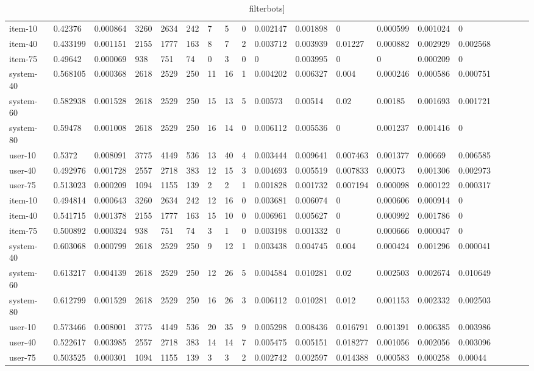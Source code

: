 \begin{table}
{\begin{tabular}{*{19}l}
item-10		&	0.42376  &	0.000864 &	3260 &	2634 &	242 &	7  &	5 &	0 &	0.002147 &	0.001898 &	0 &	0.000599 &	0.001024 &	0 &	 \\
item-40		&	0.433199 &	0.001151 &	2155 &	1777 &	163 &	8  &	7 &	2 &	0.003712 &	0.003939 &	0.01227 &	0.000882 &	0.002929 &	0.002568 &	 \\
item-75		&	0.49642  &	0.000069 &	938  &	751  &	74 &	0  &	3 &	0 &	0 &	0.003995 &	0 &	0 &	0.000209 &	0 &	 \\
system-40	&	0.568105 &	0.000368 &	2618 &	2529 &	250 &	11 &	16 &	1 &	0.004202 &	0.006327 &	0.004 &	0.000246 &	0.000586 &	0.000751 &	 \\
system-60	&	0.582938 &	0.001528 &	2618 &	2529 &	250 &	15 &	13 &	5 &	0.00573 &	0.00514 &	0.02 &	0.00185 &	0.001693 &	0.001721 &	 \\
system-80	&	0.59478  &	0.001008 &	2618 &	2529 &	250 &	16 &	14 &	0 &	0.006112 &	0.005536 &	0 &	0.001237 &	0.001416 &	0 &	 \\
user-10		&	0.5372   &	0.008091 &	3775 &	4149 &	536 &	13 &	40 &	4 &	0.003444 &	0.009641 &	0.007463 &	0.001377 &	0.00669 &	0.006585 &	 \\
user-40		&	0.492976 &	0.001728 &	2557 &	2718 &	383 &	12 &	15 &	3 &	0.004693 &	0.005519 &	0.007833 &	0.00073 &	0.001306 &	0.002973 &	 \\
user-75		&	0.513023 &	0.000209 &	1094 &	1155 &	139 &	2  &	2 &	1 &	0.001828 &	0.001732 &	0.007194 &	0.000098 &	0.000122 &	0.000317 &	 \\

item-10		&	0.494814 &	0.000643 &	3260 &	2634 &	242 &	12 &	16 &	0 &	0.003681 &	0.006074 &	0 &	0.000606 &	0.000914 &	0 &	 \\
item-40		&	0.541715 &	0.001378 &	2155 &	1777 &	163 &	15 &	10 &	0 &	0.006961 &	0.005627 &	0 &	0.000992 &	0.001786 &	0 &	 \\
item-75		&	0.500892 &	0.000324 &	938 &	751 &	74 &	3  &	1 &	0 &	0.003198 &	0.001332 &	0 &	0.000666 &	0.000047 &	0 &	 \\
system-40	&	0.603068 &	0.000799 &	2618 &	2529 &	250 &	9  &	12 &	1 &	0.003438 &	0.004745 &	0.004 &	0.000424 &	0.001296 &	0.000041 &	 \\
system-60	&	0.613217 &	0.004139 &	2618 &	2529 &	250 &	12 &	26 &	5 &	0.004584 &	0.010281 &	0.02 &	0.002503 &	0.002674 &	0.010649 &	 \\
system-80	&	0.612799 &	0.001529 &	2618 &	2529 &	250 &	16 &	26 &	3 &	0.006112 &	0.010281 &	0.012 &	0.001153 &	0.002332 &	0.002503 &	 \\
user-10		&	0.573466 &	0.008001 &	3775 &	4149 &	536 &	20 &	35 &	9 &	0.005298 &	0.008436 &	0.016791 &	0.001391 &	0.006385 &	0.003986 &	 \\
user-40		&	0.522617 &	0.003985 &	2557 &	2718 &	383 &	14 &	14 &	7 &	0.005475 &	0.005151 &	0.018277 &	0.001056 &	0.002056 &	0.003096 &	 \\
user-75		&	0.503525 &	0.000301 &	1094 &	1155 &	139 &	3 &	3 &	2 &	0.002742 &	0.002597 &	0.014388 &	0.000583 &	0.000258 &	0.00044 &	 \\
\bottomrule\end{tabular}}\caption{filterbots]}\end{table}


